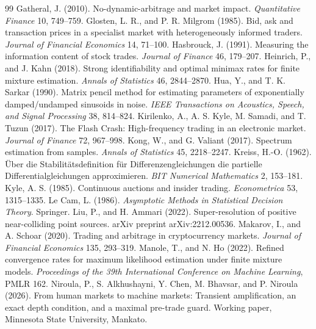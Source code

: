 \begin{thebibliography}{99}
 Gatheral, J. (2010). No-dynamic-arbitrage and market impact. \emph{Quantitative Finance} 10, 749--759.
 Glosten, L. R., and P. R. Milgrom (1985). Bid, ask and transaction prices in a specialist market with heterogeneously informed traders. \emph{Journal of Financial Economics} 14, 71--100.
 Hasbrouck, J. (1991). Measuring the information content of stock trades. \emph{Journal of Finance} 46, 179--207.
 Heinrich, P., and J. Kahn (2018). Strong identifiability and optimal minimax rates for finite mixture estimation. \emph{Annals of Statistics} 46, 2844--2870.
 Hua, Y., and T. K. Sarkar (1990). Matrix pencil method for estimating parameters of exponentially damped/undamped sinusoids in noise. \emph{IEEE Transactions on Acoustics, Speech, and Signal Processing} 38, 814--824.
 Kirilenko, A., A. S. Kyle, M. Samadi, and T. Tuzun (2017). The Flash Crash: High-frequency trading in an electronic market. \emph{Journal of Finance} 72, 967--998.
 Kong, W., and G. Valiant (2017). Spectrum estimation from samples. \emph{Annals of Statistics} 45, 2218--2247.
 Kreiss, H.-O. (1962). \"Uber die Stabilit\"atsdefinition f\"ur Differenzengleichungen die partielle Differentialgleichungen approximieren. \emph{BIT Numerical Mathematics} 2, 153--181.
 Kyle, A. S. (1985). Continuous auctions and insider trading. \emph{Econometrica} 53, 1315--1335.
 Le Cam, L. (1986). \emph{Asymptotic Methods in Statistical Decision Theory}. Springer.
 Liu, P., and H. Ammari (2022). Super-resolution of positive near-colliding point sources. arXiv preprint arXiv:2212.00536.
 Makarov, I., and A. Schoar (2020). Trading and arbitrage in cryptocurrency markets. \emph{Journal of Financial Economics} 135, 293--319.
 Manole, T., and N. Ho (2022). Refined convergence rates for maximum likelihood estimation under finite mixture models. \emph{Proceedings of the 39th International Conference on Machine Learning}, PMLR 162.
 Niroula, P., S. Alkhushayni, Y. Chen, M. Bhavsar, and P. Niroula (2026). From human markets to machine markets: Transient amplification, an exact depth condition, and a maximal pre-trade guard. Working paper, Minnesota State University, Mankato.

\end{thebibliography}
